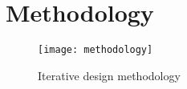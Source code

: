 
	







\section{Methodology}

\begin{figure}
\centering
\texttt{[image: methodology]}
\caption{Iterative design methodology}
\label{methodology}
\end{figure}

